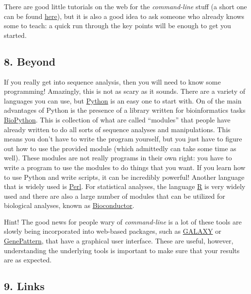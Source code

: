 \documentclass[]{article}
\begin{document}
There are good little tutorials on the web for the \emph{command-line}
stuff (a short one can be found
\href{http://compbio.massey.ac.nz/wiki/\#!comp_unix.md}{here}), but it
is also a good idea to ask someone who already knows some to teach: a
quick run through the key points will be enough to get you started.

\subsection{8. Beyond}\label{beyond}

If you really get into sequence analysis, then you will need to know
some programming! Amazingly, this is not as scary as it sounds. There
are a variety of languages you can use, but
\href{https://www.python.org/}{Python} is an easy one to start with. On
of the main advantages of Python is the presence of a library written
for bioinformatics tasks \href{http://www.biopython.org/}{BioPython}.
This is collection of what are called ``modules'' that people have
already written to do all sorts of sequence analyses and manipulations.
This means you don't have to write the program yourself, but you just
have to figure out how to use the provided module (which admittedly can
take some time as well). These modules are not really programs in their
own right: you have to write a program to use the modules to do things
that you want. If you learn how to use Python and write scripts, it can
be incredibly powerful! Another language that is widely used is
\href{http://www.perl.org/}{Perl}. For statistical analyses, the
language \href{http://www.r-project.org/}{R} is very widely used and
there are also a large number of modules that can be utilized for
biological analyses, known as
\href{http://www.bioconductor.org/}{Bioconductor}.

Hint! The good news for people wary of \emph{command-line} is a lot of
these tools are slowly being incorporated into web-based packages, such
as \href{http://usegalaxy.org}{GALAXY} or
\href{https://www.broadinstitute.org/cancer/software/genepattern/}{GenePattern},
that have a graphical user interface. These are useful, however,
understanding the underlying tools is important to make sure that your
results are as expected.

\subsection{9. Links}\label{links}
\end{document}
